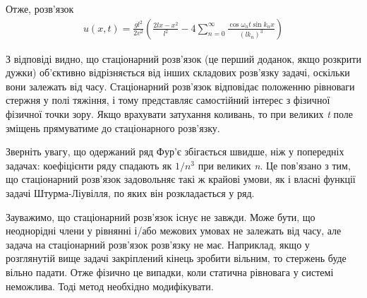 Отже, розв'язок 
\begin{equation} \label{Cauchy-sol5,1}
    \begin{gathered}
        u(x,t) = \frac{g l^2}{2v^2} \left(\frac{2lx - x^2}{l^2} - 4\sum_{n=0}^{\infty} \frac{\cos\omega_nt \sin k_nx}{(lk_n)^3}\right)
    \end{gathered}
\end{equation} 

З відповіді видно, що стаціонарний розв'язок (це перший доданок, якщо розкрити дужки) об'єктивно відрізняється від інших складових розв'язку задачі, оскільки вони залежать від часу. Стаціонарний розв'язок відповідає положенню рівноваги стержня у полі тяжіння, і тому представляє самостійний інтерес з фізичної фізичної точки зору. Якщо врахувати затухання коливань, то при великих \textit{t}  поле зміщень прямуватиме до стаціонарного розв'язку. 

Зверніть увагу, що одержаний ряд Фур'є збігається швидше, ніж у попередніх задачах: коефіцієнти ряду спадають як $1/n^3$ при великих \textit{n}. Це пов'язано з тим, що стаціонарний розв'язок задовольняє такі ж крайові умови, як і власні функції задачі Штурма-Ліувілля, по яких він розкладається у ряд.  

Зауважимо, що стаціонарний розв'язок існує не завжди. Може бути, що неоднорідні члени у рівнянні і/або межових умовах не залежать від часу, але задача на стаціонарний розв'язок розв'язку не має.  Наприклад, якщо у розглянутій вище задачі закріплений кінець зробити вільним, то стержень буде вільно падати. Отже фізично це випадки, коли статична рівновага у системі неможлива. Тоді метод необхідно модифікувати.


%